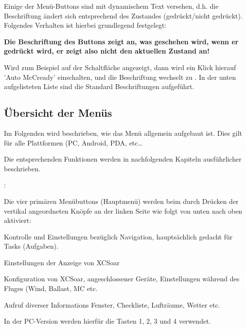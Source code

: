 Einige der Menü-Buttons sind mit dynamischem Text versehen, d.h. die Beschriftung ändert sich entsprechend des Zustandes (gedrückt/nicht gedrückt). Folgendes Verhalten ist hierbei grundlegend festgelegt:


\textbf{Die Beschriftung des Buttons zeigt an,\textcolor[rgb]{0.72,0.03,0.20}{ was geschehen wird}, wenn er \achtung gedrückt wird, er zeigt also nicht den aktuellen Zustand an!}

Wird zum Beispiel auf der Schaltfläche   angezeigt, dann wird ein Klick hierauf   'Auto
McCready' einschalten, und die Beschriftung wechselt zu  .
In der unten aufgelisteten Liste sind die Standard Beschriftungen aufgeführt.

\subsection*{Übersicht der Menüs}
Im Folgenden wird beschrieben, wie das Menü allgemein aufgebaut ist.
Dies gilt für alle Plattformen (\textsf{PC}, Android, \al PDA, etc\dots

Die entsprechenden Funktionen werden in nachfolgenden Kapiteln ausführlicher beschrieben.

\textsf{\al}:

Die vier primären Menübuttons (Hauptmenü) werden beim \al durch Drücken der vertikal angeordneten Knöpfe an der linken Seite wie folgt von unten nach oben aktiviert:

\begin{jspecs}
\item[\button{Nav}]       Kontrolle und Einstellungen bezüglich Navigation, hauptsächlich gedacht für Tasks (Aufgaben).
\item[\button{Anzeige}] Einstellungen der Anzeige von \textsf{XCSoar}
\item[\button{Konfig.}]  Konfiguration von \textsf{XCSoar}, angeschlossener Geräte,
                                      Einstellungen während des Fluges (Wind, Ballast, MC etc.\
\item[\button{Info}]       Aufruf diverser Informations Fenster,  Checkliste, Lufträume, Wetter etc.\
\end{jspecs}

In der \textsf{\textsf{PC}}-Version werden hierfür die Tasten  1, 2, 3 und 4 verwendet.

